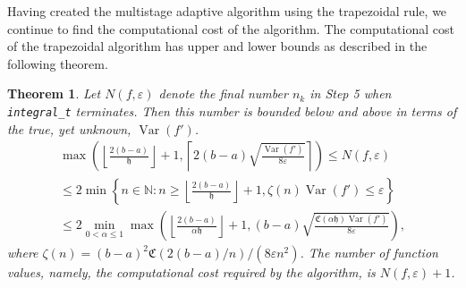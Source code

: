 \documentclass{iitthesis}
\DeclareMathOperator{\Var}{Var}
\newtheorem{theorem}{Theorem}
\theoremstyle{definition}
\theoremstyle{remark}
\begin{document}
Having created the multistage adaptive algorithm using the trapezoidal rule, we continue to find the computational cost of the algorithm. The computational cost of the trapezoidal algorithm has upper and lower bounds as described in the following theorem.
\begin{theorem}\label{uppbndcosttrap}
    Let $N(f,\varepsilon)$ denote the final number $n_k$ in Step 5 when {\tt integral\_t} terminates. Then this number is bounded below and above in terms of the true, yet unknown, $\Var(f')$.
    \begin{multline}\label{uppbndcosttrapineq}
        \max\left(\left\lfloor\frac{2(b-a)}{\mathfrak{h}}\right\rfloor+1,\left\lceil2(b-a)\sqrt{\frac{\Var(f')}{8\varepsilon}}\right\rceil\right)\leq N(f,\varepsilon)\\ \leq 2\min\left\{n\in\mathbb{N}:n\geq\left\lfloor\frac{2(b-a)}{\mathfrak{h}}\right\rfloor+1,\zeta(n)\Var(f')\leq\varepsilon\right\}\\ \leq 2\min_{0<\alpha\leq1}\max\left(\left\lfloor\frac{2(b-a)}{\alpha\mathfrak{h}}\right\rfloor+1,(b-a)\sqrt{\frac{\mathfrak{C}(\alpha\mathfrak{h})\Var(f')}{8\varepsilon}}\right),
    \end{multline}
    where $\zeta(n)=(b-a)^2\mathfrak{C}(2(b-a)/n)/(8\varepsilon n^2)$. The number of function values, namely, the computational cost required by the algorithm, is $N(f,\varepsilon)+1$.
\end{theorem}
\end{document}
